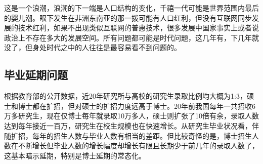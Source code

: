 \documentclass[]{tufte-book}
\begin{document}
这是一个浪潮，浪潮的下一端是人口结构的变化，千禧一代可能是世界范围内最后的婴儿潮。眼下发生在非洲东南亚的那一拨可能有人口红利，但没有互联网同步发展的技术红利，如果不出现类似互联网的普惠技术，很多发展中国家事实上或者说政治上不存在多大的发展空间。所有问题都可能是时代问题，这几年有，下几年就没了，但身处时代之中的人往往是最容易看不到问题的。

\hypertarget{ux6bd5ux4e1aux5ef6ux671fux95eeux9898}{%
\subsection{毕业延期问题}\label{ux6bd5ux4e1aux5ef6ux671fux95eeux9898}}

根据教育部的公开数据，近20年研究所与高校的研究生录取比例均大概为1:3，硕士和博士都在扩招，但对硕士的扩招力度远高于博士。20年前我国每年一共招收6万多研究生，现在仅博士每年就录取10万多人，硕士则扩张了10倍有余，录取人数达到每年接近一百万，研究生在校生规模也在快速增长。从研究生毕业状况看，伴随扩招，每年的招生人数与毕业人数有相当的差距。但比较奇怪的是，博士招生人数在不断增长但毕业人数的增长幅度却增长有限且长期少于前几年的录取人数了，这基本暗示延期，特别是博士延期的常态化。
\end{document}
